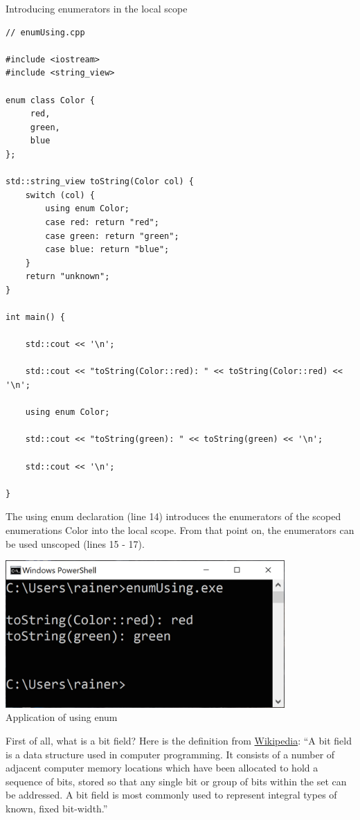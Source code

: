 \noindent
Introducing enumerators in the local scope
\begin{lstlisting}[style=styleCXX]
// enumUsing.cpp

#include <iostream>
#include <string_view>

enum class Color {
	 red,
	 green,
	 blue
};

std::string_view toString(Color col) {
	switch (col) {
		using enum Color;
		case red: return "red";
		case green: return "green";
		case blue: return "blue";
	}
	return "unknown";
}

int main() {

	std::cout << '\n';
	
	std::cout << "toString(Color::red): " << toString(Color::red) << '\n';
	
	using enum Color;
	
	std::cout << "toString(green): " << toString(green) << '\n';
	
	std::cout << '\n';

}
\end{lstlisting}

The using enum declaration (line 14) introduces the enumerators of the scoped enumerations Color into the local scope. From that point on, the enumerators can be used unscoped (lines 15 - 17).

\begin{center}
\includegraphics[width=0.8\textwidth]{content/3/chapter4/images/48.png}\\
Application of using enum
\end{center}


First of all, what is a bit field? Here is the definition from \href{https://en.wikipedia.org/wiki/Bit_field}{Wikipedia}: “A bit field is a data structure used in computer programming. It consists of a number of adjacent computer memory locations which have been allocated to hold a sequence of bits, stored so that any single bit or group of bits within the set can be addressed. A bit field is most commonly used to represent integral types of known, fixed bit-width.”


